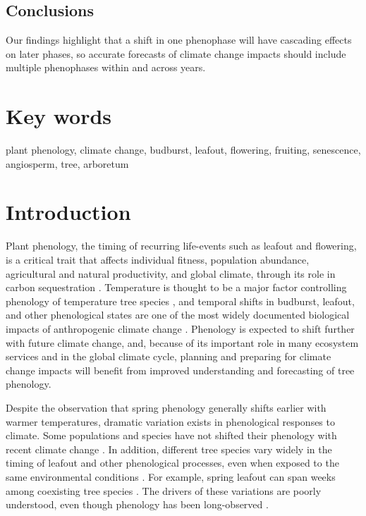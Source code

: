 \documentclass{article}
\begin{document}
\subsection*{Conclusions}
Our findings highlight that a shift in one phenophase will have cascading effects on later phases, so accurate forecasts of climate change impacts should include multiple phenophases within and across years. 

\section* {Key words}
plant phenology, climate change, budburst, leafout, flowering, fruiting, senescence, angiosperm, tree, arboretum
\section* {Introduction}
Plant phenology, the timing of recurring life-events such as leafout and flowering, is a critical trait that affects individual fitness, population abundance, agricultural and natural productivity, and global climate, through its role in carbon sequestration \citep{cleland2007,miller-rushing2008,primack2009a,willis2010,miller-rushing2010}. Temperature is thought to be a major factor controlling phenology of temperature tree species \citep{parmesan2006, morin2010,schwartz2013}, and temporal shifts in budburst, leafout, and other phenological states are one of the most widely documented biological impacts of anthropogenic climate change \citep{parmesan2006}. Phenology is expected to shift further with future climate change, and, because of its important role in many ecosystem services and in the global climate cycle, planning and preparing for climate change impacts will benefit from improved understanding and forecasting of tree phenology. %
\par Despite the observation that spring phenology generally shifts earlier with warmer temperatures, dramatic variation exists in phenological responses to climate. Some populations and species have not shifted their phenology with recent climate change \citep{wolkovich2012}. In addition, different tree species vary widely in the timing of leafout and other phenological processes, even when exposed to the same environmental conditions \citep{lechowicz1984,primack2009c}. For example, spring leafout can span weeks among coexisting tree species \citep{lechowicz1984}. The drivers of these variations are poorly understood, even though phenology has been long-observed \citep{wolkovich2014}.
\end{document}
